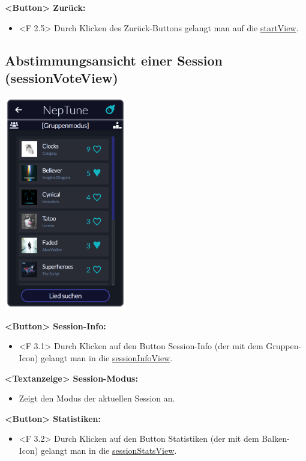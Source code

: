 \documentclass[oneside, ngerman]{sdqtechreport}
\begin{document}
\textbf{<Button> Zurück:}
\begin{itemize}
    \hypertarget{<F 2.5>}{}
    \item <F 2.5> Durch Klicken des Zurück-Buttons gelangt man auf die \hyperlink{startView}{startView}.
\end{itemize}



\subsection{Abstimmungsansicht einer Session (sessionVoteView)}
\label{sec:Benutzeroberfläche:sessionVoteView}

\begin{center}
    \hypertarget{sessionVoteView}{}
    \includegraphics[width=0.4\textwidth]{LATEX/Pflichtenheft/GraphicDesigns/userVotePage.png}
\end{center}

\textbf{<Button> Session-Info:}
\begin{itemize}
    \hypertarget{<F 3.1>}{}
    \item <F 3.1> Durch Klicken auf den Button Session-Info (der mit dem Gruppen-Icon) gelangt man in die \hyperlink{sessionInfoView}{sessionInfoView}.
\end{itemize}

\textbf{<Textanzeige> Session-Modus:}
\begin{itemize}
    \item Zeigt den Modus der aktuellen Session an.
\end{itemize}

\textbf{<Button> Statistiken:}
\begin{itemize}
    \hypertarget{<F 3.2>}{}
    \item <F 3.2> Durch Klicken auf den Button Statistiken (der mit dem Balken-Icon) gelangt man in die \hyperlink{sessionStatsView}{sessionStatsView}.
\end{itemize}
\end{document}
